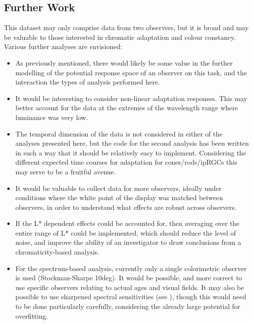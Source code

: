\subsection{Further Work}

This dataset may only comprise data from two observers, but it is broad and may be valuable to those interested in chromatic adaptation and colour constancy. Various further analyses are envisioned:
\begin{itemize}
    \item As previously mentioned, there would likely be some value in the further modelling of the potential response space of an observer on this task, and the interaction the types of analysis performed here.
    \item It would be interesting to consider non-linear adaptation responses. This may better account for the data at the extremes of the wavelength range where luminance was very low.
    \item The temporal dimension of the data is not considered in either of the analyses presented here, but the code for the second analysis has been written in such a way that it should be relatively easy to implement. Considering the different expected time courses for adaptation for cones/rods/\glspl{ipRGC} this may serve to be a fruitful avenue.
    \item It would be valuable to collect data for more observers, ideally under conditions where the white point of the display was matched between observers, in order to understand what effects are robust across observers.
    \item If the L* dependent effects could be accounted for, then averaging over the entire range of L* could be implemented, which should reduce the level of noise, and improve the ability of an investigator to draw conclusions from a chromaticity-based analysis.
    \item For the spectrum-based analysis, currently only a single colorimetric observer is used (Stockman-Sharpe 10deg). It would be possible, and more correct to use specific observers relating to actual ages and visual fields. It may also be possible to use sharpened spectral sensitivities (see \citet{finlayson_spectral_1994}), though this would need to be done particularly carefully, considering the already large potential for overfitting.
\end{itemize}










